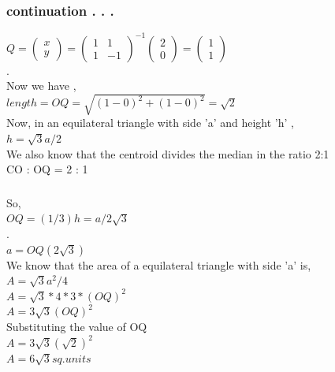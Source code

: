 \documentclass{beamer}
\begin{document}
\begin{frame}
\frametitle{continuation . . .}

\quad \quad \quad \quad \quad  $ Q = \begin{pmatrix}
x \\ y
\end{pmatrix} = 
\begin{pmatrix}
1 & 1 \\ 1 & -1 
\end{pmatrix} ^{-1}
\begin{pmatrix}
2 \\ 0
\end{pmatrix} = 
\begin{pmatrix}
1 \\ 1
\end{pmatrix} $ 
\\ . \\
Now we have ,\\ \quad\quad\quad $length = OQ =  \sqrt{(1-0)^2 + (1-0)^2} = \sqrt{2}$\\
Now, in an equilateral triangle with side 'a' and height 'h' ,\\
 \quad\quad\quad\quad\quad\quad \quad\quad\quad $h = \sqrt{3}a/2$\\ 
 We also know that the centroid divides the median in the ratio 2:1 \\
 \quad\quad\quad\quad\quad\quad\quad CO : OQ  = 2 : 1
\end{frame}


\begin{frame}
\frametitle{}
So, \\  \quad\quad\quad\quad\quad\quad\quad $ OQ = (1/3)h  =  a/2\sqrt{3} $ \\ . \\
 \quad\quad\quad\quad\quad\quad\quad  $ a = OQ(2\sqrt{3}) $  \\
 We know that the area of a equilateral triangle with side 'a' is,\\
  \quad\quad\quad\quad\quad\quad\quad $ A = \sqrt{3}{a}^2/4 $ \\
   \quad\quad\quad\quad\quad\quad\quad  $ A = \sqrt{3} * 4* 3*(OQ)^2 $\\
      \quad\quad\quad\quad\quad\quad\quad $ A =  3\sqrt{3}(OQ)^2 $\\
      Substituting the value of OQ \\
      \quad\quad\quad\quad\quad\quad\quad $ A = 3\sqrt{3}(\sqrt{2})^2  $\\
      \quad\quad\quad\quad\quad\quad\quad  $  A = 6\sqrt{3} sq.units $
     \end{frame}
\end{document}

